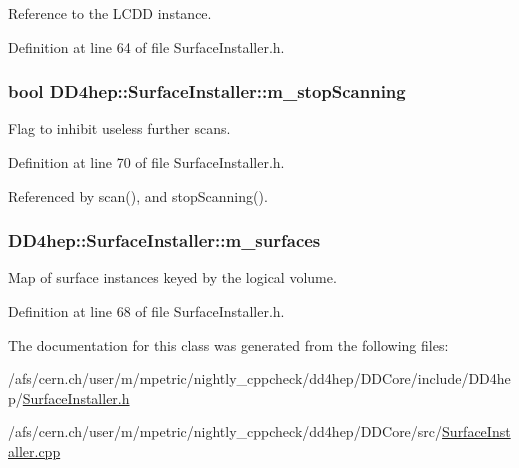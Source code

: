 Reference to the LCDD instance. 

Definition at line 64 of file SurfaceInstaller.h.\hypertarget{class_d_d4hep_1_1_surface_installer_ab8193ffcef2d5b522aba8d594a2da412}{
\subsubsection[{m\_\-stopScanning}]{\setlength{\rightskip}{0pt plus 5cm}bool {\bf DD4hep::SurfaceInstaller::m\_\-stopScanning}}}
\label{class_d_d4hep_1_1_surface_installer_ab8193ffcef2d5b522aba8d594a2da412}


Flag to inhibit useless further scans. 

Definition at line 70 of file SurfaceInstaller.h.

Referenced by scan(), and stopScanning().\hypertarget{class_d_d4hep_1_1_surface_installer_aa301ec142bb36afc171389e0e8acabd2}{
\subsubsection[{m\_\-surfaces}]{ {\bf DD4hep::SurfaceInstaller::m\_\-surfaces}}}
\label{class_d_d4hep_1_1_surface_installer_aa301ec142bb36afc171389e0e8acabd2}


Map of surface instances keyed by the logical volume. 

Definition at line 68 of file SurfaceInstaller.h.

The documentation for this class was generated from the following files:\begin{DoxyCompactItemize}
\item 
/afs/cern.ch/user/m/mpetric/nightly\_\-cppcheck/dd4hep/DDCore/include/DD4hep/\hyperlink{_surface_installer_8h}{SurfaceInstaller.h}\item 
/afs/cern.ch/user/m/mpetric/nightly\_\-cppcheck/dd4hep/DDCore/src/\hyperlink{_surface_installer_8cpp}{SurfaceInstaller.cpp}\end{DoxyCompactItemize}

